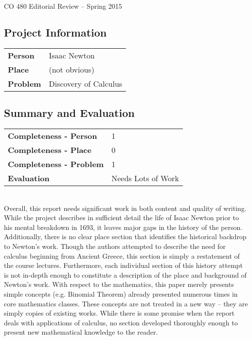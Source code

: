 \documentclass[11pt]{article}
\begin{document}
\begin{center}
{\Large CO 480 Editorial Review -- Spring 2015} 
\end{center}

\subsection*{Project Information} %
\begin{tabular}{ll}
{\bf Person}  & Isaac Newton \\
{\bf Place}   & (not obvious) \\
{\bf Problem} & Discovery of Calculus \\
\end{tabular}

\subsection*{Summary and Evaluation}

\begin{tabular}{ll}
{\bf Completeness - Person}  & 1 \\
{\bf Completeness - Place}   & 0 \\
{\bf Completeness - Problem} & 1 \\
{\bf Evaluation}             & Needs Lots of Work \\
\end{tabular}\\

Overall, this report needs significant work in both content and quality of writing. While the project describes in sufficient detail the life of Isaac Newton prior to his mental breakdown in 1693, it leaves major gaps in the history of the person. Additionally, there is no clear place section that identifies the historical backdrop to Newton's work. Though the authors attempted to describe the need for calculus beginning from Ancient Greece, this section is simply a restatement of the course lectures. Furthermore, each individual section of this history attempt is not in-depth enough to constitute a description of the place and background of Newton's work. With respect to the mathematics, this paper merely presents simple concepts (e.g. Binomial Theorem) already presented numerous times in core mathematics classes. These concepts are not treated in a new way -- they are simply copies of existing works. While there is some promise when the report deals with applications of calculus, no section developed thoroughly enough to present new mathematical knowledge to the reader.\\
\end{document}
